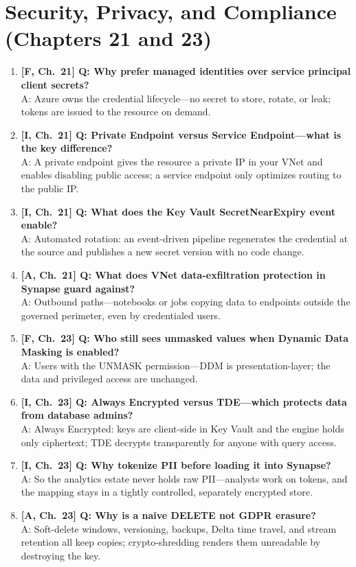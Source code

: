 \section{Security, Privacy, and Compliance (Chapters 21 and 23)}

\begin{enumerate}
    \item \textbf{[F, Ch.~21] Q: Why prefer managed identities over service principal client secrets?}\\
    A: Azure owns the credential lifecycle---no secret to store, rotate, or leak; tokens are issued to the resource on demand.
    \item \textbf{[I, Ch.~21] Q: Private Endpoint versus Service Endpoint---what is the key difference?}\\
    A: A private endpoint gives the resource a private IP in your VNet and enables disabling public access; a service endpoint only optimizes routing to the public IP.
    \item \textbf{[I, Ch.~21] Q: What does the Key Vault SecretNearExpiry event enable?}\\
    A: Automated rotation: an event-driven pipeline regenerates the credential at the source and publishes a new secret version with no code change.
    \item \textbf{[A, Ch.~21] Q: What does VNet data-exfiltration protection in Synapse guard against?}\\
    A: Outbound paths---notebooks or jobs copying data to endpoints outside the governed perimeter, even by credentialed users.
    \item \textbf{[F, Ch.~23] Q: Who still sees unmasked values when Dynamic Data Masking is enabled?}\\
    A: Users with the UNMASK permission---DDM is presentation-layer; the data and privileged access are unchanged.
    \item \textbf{[I, Ch.~23] Q: Always Encrypted versus TDE---which protects data from database admins?}\\
    A: Always Encrypted: keys are client-side in Key Vault and the engine holds only ciphertext; TDE decrypts transparently for anyone with query access.
    \item \textbf{[I, Ch.~23] Q: Why tokenize PII before loading it into Synapse?}\\
    A: So the analytics estate never holds raw PII---analysts work on tokens, and the mapping stays in a tightly controlled, separately encrypted store.
    \item \textbf{[A, Ch.~23] Q: Why is a naive DELETE not GDPR erasure?}\\
    A: Soft-delete windows, versioning, backups, Delta time travel, and stream retention all keep copies; crypto-shredding renders them unreadable by destroying the key.
\end{enumerate}

